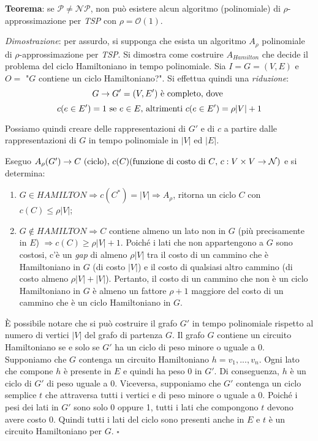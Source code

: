\textbf{Teorema}: se $\mathcal{P} \ne \mathcal{NP}$, non può esistere alcun algoritmo
(polinomiale) di $\rho$-approssimazione per \textit{TSP} con $\rho = \mathcal{O}(1)$.

\textit{Dimostrazione}: per assurdo, si supponga che esista un algoritmo $A_\rho$
polinomiale di $\rho$-approssimazione per \textit{TSP}. Si dimostra come costruire $A_{Hamilton}$
che decide il problema del ciclo Hamiltoniano in tempo polinomiale. Sia $I = G =(V,E)$
e $O = $ "$G$ contiene un ciclo Hamiltoniano?". Si effettua quindi una \textit{riduzione}:
\[
    G \rightarrow G' = (V, E') \textnormal{ è completo, dove }
\]
\[
    c(e \in E') = 1 \textnormal{ se } e \in E \textnormal{, altrimenti } c(e \in E') = \rho|V| + 1
\]

Possiamo quindi creare delle rappresentazioni di $G'$ e di $c$ a partire dalle rappresentazioni
di $G$ in tempo polinomiale in $|V|$ ed $|E|$.

Eseguo $A_\rho(G') \rightarrow C \textnormal{ (ciclo), } c(C) \textnormal{(funzione di costo di $C$, $c: V \times V \rightarrow \mathcal{N}$)}$ e si
determina:
\begin{enumerate}
\item $G \in HAMILTON \Rightarrow c(C^*) = |V| \Rightarrow A_\rho$, ritorna un ciclo $C$
con $c(C) \le \rho|V|$;
\item $G \not\in HAMILTON \Rightarrow C$ contiene almeno un lato non in
$G$ (più precisamente in $E$) $\Rightarrow c(C) \ge \rho|V| + 1$. Poiché i lati che non
appartengono a $G$ sono costosi, c'è un \textit{gap} di almeno $\rho |V|$ tra il costo di un cammino
che è Hamiltoniano in $G$ (di costo $|V|$) e il costo di qualsiasi altro cammino (di costo
almeno $\rho |V| + |V|$). Pertanto, il costo di un cammino che non è un ciclo Hamiltoniano
in $G$ è almeno un fattore $\rho + 1$ maggiore del costo di un cammino che è un ciclo
Hamiltoniano in $G$.
\end{enumerate}

È possibile notare che si può costruire il grafo $G'$ in tempo polinomiale rispetto al numero
di vertici $|V|$ del grafo di partenza $G$. Il grafo $G$ contiene un circuito Hamiltoniano se e
solo se $G'$ ha un ciclo di peso minore o uguale a 0. Supponiamo che $G$ contenga un circuito
Hamiltoniano $h = v_1, ..., v_n$. Ogni lato che compone $h$ è presente in $E$ e quindi ha peso 0 in $G'$.
Di conseguenza, $h$ è un ciclo di $G'$ di peso uguale a 0. Viceversa, supponiamo che $G'$ contenga un ciclo
semplice $t$ che attraversa tutti i vertici e di peso minore o uguale a 0. Poiché i pesi dei lati
in $G'$ sono solo 0 oppure 1, tutti i lati che compongono $t$ devono avere costo 0. Quindi tutti i
lati del ciclo sono presenti anche in $E$ e $t$ è un circuito Hamiltoniano per $G$. $\square$

